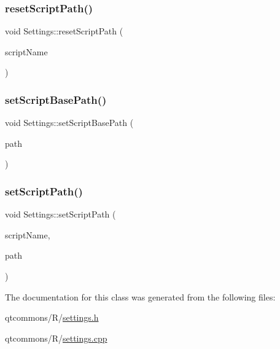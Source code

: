 \subsubsection{\texorpdfstring{resetScriptPath()}{resetScriptPath()}}
{\footnotesize\ttfamily void Settings\+::reset\+Script\+Path (\begin{DoxyParamCaption}\item[{const Q\+String \&}]{script\+Name }\end{DoxyParamCaption})}

\mbox{\label{classdisplace_1_1_r_1_1_settings_a03496fdb1e39f653fb407a2eb5a0b8bc}} 
\subsubsection{\texorpdfstring{setScriptBasePath()}{setScriptBasePath()}}
{\footnotesize\ttfamily void Settings\+::set\+Script\+Base\+Path (\begin{DoxyParamCaption}\item[{const Q\+String \&}]{path }\end{DoxyParamCaption})}

\mbox{\label{classdisplace_1_1_r_1_1_settings_a77fa020ac605f9b1c609e7424f0a4d0d}} 
\subsubsection{\texorpdfstring{setScriptPath()}{setScriptPath()}}
{\footnotesize\ttfamily void Settings\+::set\+Script\+Path (\begin{DoxyParamCaption}\item[{const Q\+String \&}]{script\+Name,  }\item[{const Q\+String \&}]{path }\end{DoxyParamCaption})}



The documentation for this class was generated from the following files\+:\begin{DoxyCompactItemize}
\item 
qtcommons/\+R/\mbox{\hyperlink{qtcommons_2_r_2settings_8h}{settings.\+h}}\item 
qtcommons/\+R/\mbox{\hyperlink{qtcommons_2_r_2settings_8cpp}{settings.\+cpp}}\end{DoxyCompactItemize}
